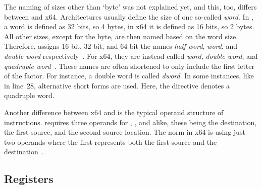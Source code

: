 The naming of sizes other than `byte' was not explained yet, and this, too, differs between \riscv{} and x64.
Architectures usually define the size of one so-called \emph{word}.
In \riscv{}, a word is defined as 32 bits, so 4 bytes, in x64 it is defined as 16 bits, so 2 bytes.
All other sizes, except for the byte, are then named based on the word size.
Therefore, \riscv{} assigns 16-bit, 32-bit, and 64-bit the names \emph{half word}, \emph{word}, and \emph{double word} respectively~\cite[p.~6]{Waterman2019}.
For x64, they are instead called \emph{word}, \emph{double word}, and \emph{quadruple word}~\cite[p.~3]{Kusswurm2018-nd}.
These names are often shortened to only include the first letter of the factor.
For instance, a double word is called \emph{dword}.
In some instances, like in line~28, alternative short forms are used.
Here, the directive  denotes a quadruple word.

Another difference between x64 and \riscv{} is the typical operand structure of instructions.
\riscv{} requires three operands for , , and alike, these being the destination, the first source, and the second source location.
The norm in x64 is using just two operands where the first represents both the first source and the destination~\cite[pp.~14--20]{Dandamudi2005Risc}.

\subsection{Registers}

